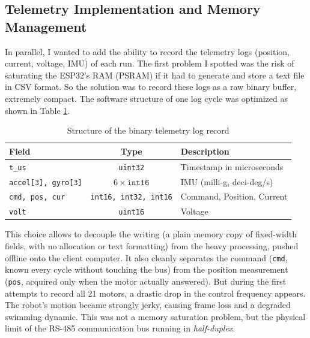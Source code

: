 \documentclass{tropLaClasse}
\begin{document}
\subsection{Telemetry Implementation and Memory Management}

In parallel, I wanted to add the ability to record the telemetry logs (position, current, voltage, IMU) of each run. The first problem I spotted was the risk of saturating the ESP32's RAM (PSRAM) if it had to generate and store a text file in CSV format. So the solution was to record these logs as a raw binary buffer, extremely compact. The software structure of one log cycle was optimized as shown in Table \ref{tab:telemetry}.

\begin{table}[h]
\centering
\begin{tabular}{|l|c|l|}
\hline
\textbf{Field} & \textbf{Type} & \textbf{Description} \\ \hline
\texttt{t\_us} & \texttt{uint32} & Timestamp in microseconds \\ \hline
\texttt{accel[3], gyro[3]} & $6 \times \texttt{int16}$ & IMU (milli-g, deci-deg/s) \\ \hline
\texttt{cmd, pos, cur} & \texttt{int16, int32, int16} & Command, Position, Current \\ \hline
\texttt{volt} & \texttt{uint16} & Voltage \\ \hline
\end{tabular}
\caption{Structure of the binary telemetry log record}
\label{tab:telemetry}
\end{table}

This choice allows to decouple the writing (a plain memory copy of fixed-width fields, with no allocation or text formatting) from the heavy processing, pushed offline onto the client computer. It also cleanly separates the command (\texttt{cmd}, known every cycle without touching the bus) from the position measurement (\texttt{pos}, acquired only when the motor actually answered). But during the first attempts to record all 21 motors, a drastic drop in the control frequency appears. The robot's motion became strongly jerky, causing frame loss and a degraded swimming dynamic. This was not a memory saturation problem, but the physical limit of the RS-485 communication bus running in \textit{half-duplex}.

\end{document}
